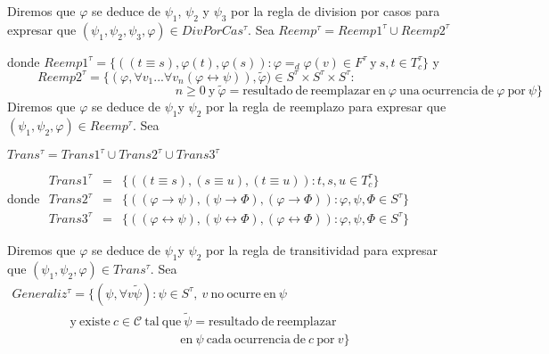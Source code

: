 Diremos que \(\varphi \) se deduce de \(\psi _{1}\), \(\psi _{2}\) y \( \psi _{3}\) por la regla de division por casos para expresar que \( (\psi _{1},\psi _{2},\psi _{3},\varphi )\in DivPorCas^{\tau }\). Sea
\(\displaystyle Reemp^{\tau }=Reemp1^{\tau }\cup Reemp2^{\tau } \)

donde \(Reemp1^{\tau }=\{((t\equiv s),\varphi (t),\varphi (s)):\varphi =_{d}\varphi (v)\in F^{\tau }\mathrm{\ y\ }s,t\in T_{c}^{\tau }\}\) y
\(\ \ \ \ \ \ \ \ \ \ \ Reemp2^{\tau }=\{(\varphi ,\forall v_{1}...\forall v_{n}(\varphi \leftrightarrow \psi )),\tilde{\varphi})\in S^{\tau }\times S^{\tau }\times S^{\tau }:\)
\(\ \ \ \ \ \ \ \ \ \ \ \ \ \ \ \ \ \ \ \ \ \ \ \ \ \ \ \ \ \ \ \ \ \ \ \ \ \ \ \ \ \ \ \ \ \ \ \ \ \ \ \ \ \ \ \ \ \ \ \ \ n\geq 0\ \mathrm{y\ } \tilde{\varphi}=\mathrm{resultado\ de\ reemplazar\ en\ }\varphi \ \mathrm{una\ ocurrencia\ de\ }\varphi \ \mathrm{por\ }\psi \}\)
Diremos que \(\varphi \) se deduce de \(\psi _{1}\)y \(\psi _{2}\) por la regla de reemplazo para expresar que \((\psi _{1},\psi _{2},\varphi )\in Reemp^{\tau }\). Sea

\(\displaystyle Trans^{\tau }=Trans1^{\tau }\cup Trans2^{\tau }\cup Trans3^{\tau } \)

donde
\(\displaystyle \begin{array}{rcl} Trans1^{\tau } & =& \{((t\equiv s),(s\equiv u),(t\equiv u)):t,s,u\in T_{c}^{\tau }\} \\ Trans2^{\tau } & =& \{((\varphi \rightarrow \psi ),(\psi \rightarrow \Phi ),(\varphi \rightarrow \Phi )):\varphi ,\psi ,\Phi \in S^{\tau }\} \\ Trans3^{\tau } & =& \{((\varphi \leftrightarrow \psi ),(\psi \leftrightarrow \Phi ),(\varphi \leftrightarrow \Phi )):\varphi ,\psi ,\Phi \in S^{\tau }\} \end{array} \)

Diremos que \(\varphi \) se deduce de \(\psi _{1}\)y \(\psi _{2}\) por la regla de transitividad para expresar que \((\psi _{1},\psi _{2},\varphi )\in Trans^{\tau }\). Sea
\(\displaystyle \begin{array}{l} Generaliz^{\tau }=\{(\psi ,\forall v\tilde{\psi}):\psi \in S^{\tau },\ v\ \mathrm{no\ ocurre\ en\ }\psi \\ \ \ \ \ \ \ \ \ \ \mathrm{\ \ \ \ \ \ \ \ \ \ \ \ y\ existe\ }c\in \mathcal{C }\ \mathrm{tal\ que\ }\tilde{\psi}=\mathrm{resultado\ de\ reemplazar} \\ \ \ \ \ \ \ \ \ \ \ \ \ \ \ \ \ \ \ \ \ \ \ \ \ \ \ \ \ \ \ \ \ \ \ \ \ \ \ \ \ \ \ \ \ \ \ \ \ \ \ \ \ \ \ \ \ \ \ \ \ \ \mathrm{en\ }\psi \ \mathrm{ cada\ ocurrencia\ de\ }c\ \mathrm{por\ }v\} \end{array} \)

